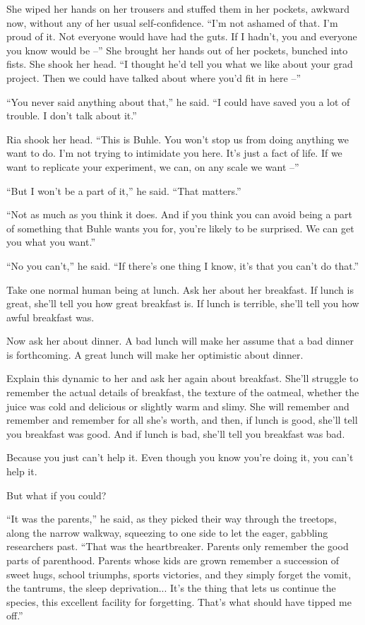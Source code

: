 She wiped her hands on her trousers and stuffed them in her pockets, 
awkward now, without any of her usual self-confidence. “I'm not 
ashamed of that. I'm proud of it. Not everyone would have had the guts. 
If I hadn't, you and everyone you know would be --” She brought her 
hands out of her pockets, bunched into fists. She shook her head. “I 
thought he'd tell you what we like about your grad project. Then we 
could have talked about where you'd fit in here --”

“You never said anything about that,” he said. “I could have 
saved you a lot of trouble. I don't talk about it.”

Ria shook her head. “This is Buhle. You won't stop us from doing 
anything we want to do. I'm not trying to intimidate you here. It's 
just a fact of life. If we want to replicate your experiment, we can, 
on any scale we want --”

“But I won't be a part of it,” he said. “That matters.”

“Not as much as you think it does. And if you think you can avoid 
being a part of something that Buhle wants you for, you're likely to be 
surprised. We can get you what you want.”

“No you can't,” he said. “If there's one thing I know, it's that 
you can't do that.”

\tb

Take one normal human being at lunch. Ask her about her breakfast. If 
lunch is great, she'll tell you how great breakfast is. If lunch is 
terrible, she'll tell you how awful breakfast was.

Now ask her about dinner. A bad lunch will make her assume that a bad 
dinner is forthcoming. A great lunch will make her optimistic about 
dinner.

Explain this dynamic to her and ask her again about breakfast. She'll 
struggle to remember the actual details of breakfast, the texture of 
the oatmeal, whether the juice was cold and delicious or slightly warm 
and slimy. She will remember and remember and remember for all she's 
worth, and then, if lunch is good, she'll tell you breakfast was good. 
And if lunch is bad, she'll tell you breakfast was bad.

Because you just can't help it. Even though you know you're doing it, 
you can't help it.

But what if you could?

\tb

“It was the parents,” he said, as they picked their way through the 
treetops, along the narrow walkway, squeezing to one side to let the 
eager, gabbling researchers past. “That was the heartbreaker. Parents 
only remember the good parts of parenthood. Parents whose kids are 
grown remember a succession of sweet hugs, school triumphs, sports 
victories, and they simply forget the vomit, the tantrums, the sleep 
deprivation... It's the thing that lets us continue the species, this 
excellent facility for forgetting. That's what should have tipped me 
off.”

